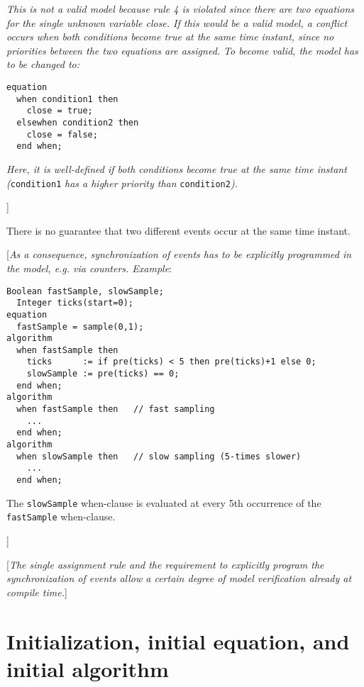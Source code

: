 \emph{This is not a valid model because rule 4 is violated since there
are two equations for the single unknown variable close. If this would
be a valid model, a conflict occurs when both conditions become true at
the same time instant, since no priorities between the two equations are
assigned. To become valid, the model has to be changed to:}

\begin{lstlisting}[language=modelica]
equation
  when condition1 then
    close = true;
  elsewhen condition2 then
    close = false;
  end when;
\end{lstlisting}

\emph{Here, it is well-defined if both conditions become true at the
same time instant (}\lstinline!condition1! \emph{has a higher priority than}
\lstinline!condition2!\emph{).}

{]}

There is no guarantee that two different events occur at the same time
instant.

{[}\emph{As a consequence, synchronization of events has to be
explicitly programmed in the model, e.g. via counters. Example}:

\begin{lstlisting}[language=modelica]
  Boolean fastSample, slowSample;
  Integer ticks(start=0);
equation
  fastSample = sample(0,1);
algorithm
  when fastSample then
    ticks      := if pre(ticks) < 5 then pre(ticks)+1 else 0;
    slowSample := pre(ticks) == 0;
  end when;
algorithm
  when fastSample then   // fast sampling
    ...
  end when;
algorithm
  when slowSample then   // slow sampling (5-times slower)
    ...
  end when;
\end{lstlisting}

The \lstinline!slowSample! when-clause is evaluated at every 5th occurrence of the
\lstinline!fastSample! when-clause.

{]}

{[}\emph{The single assignment rule and the requirement to explicitly
program the synchronization of events allow a certain degree of model
verification already at compile time.}{]}

\section{Initialization, initial equation, and initial algorithm}

